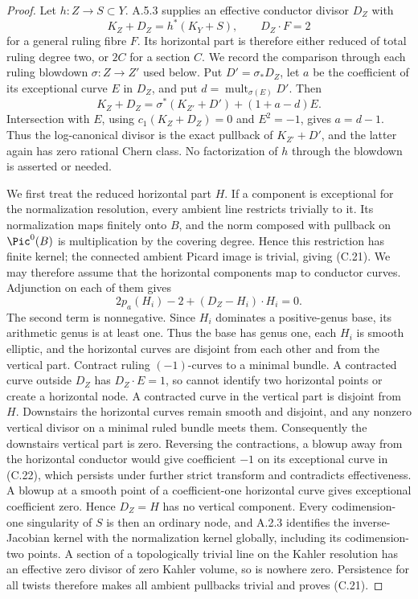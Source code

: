 \begin{proof}
Let $h:Z\to S\subset Y$. A.5.3 supplies an effective conductor divisor $D_Z$ with
\[
 K_Z+D_Z=h^*(K_Y+S),\qquad D_Z\cdot F=2              \tag{C.22}
\]
for a general ruling fibre $F$. Its horizontal part is therefore either reduced of total ruling degree two, or $2C$ for a section $C$. We record the comparison through each ruling blowdown $\sigma:Z\to Z'$ used below. Put $D'=\sigma_*D_Z$, let $a$ be the coefficient of its exceptional curve $E$ in $D_Z$, and put $d=\operatorname{mult}_{\sigma(E)}D'$. Then
\[
 K_Z+D_Z=\sigma^*(K_{Z'}+D')+(1+a-d)E.
 \tag{C.22b}
\]
Intersection with $E$, using $c_1(K_Z+D_Z)=0$ and $E^2=-1$, gives $a=d-1$. Thus the log-canonical divisor is the exact pullback of $K_{Z'}+D'$, and the latter again has zero rational Chern class. No factorization of $h$ through the blowdown is asserted or needed.

We first treat the reduced horizontal part $H$. If a component is exceptional for the normalization resolution, every ambient line restricts trivially to it. Its normalization maps finitely onto $B$, and the norm composed with pullback on $\Pic^0(B)$ is multiplication by the covering degree. Hence this restriction has finite kernel; the connected ambient Picard image is trivial, giving (C.21). We may therefore assume that the horizontal components map to conductor curves. Adjunction on each of them gives
\[
 2p_a(H_i)-2+(D_Z-H_i)\cdot H_i=0.
\]
The second term is nonnegative. Since $H_i$ dominates a positive-genus base, its arithmetic genus is at least one. Thus the base has genus one, each $H_i$ is smooth elliptic, and the horizontal curves are disjoint from each other and from the vertical part. Contract ruling $(-1)$-curves to a minimal bundle. A contracted curve outside $D_Z$ has $D_Z\cdot E=1$, so cannot identify two horizontal points or create a horizontal node. A contracted curve in the vertical part is disjoint from $H$. Downstairs the horizontal curves remain smooth and disjoint, and any nonzero vertical divisor on a minimal ruled bundle meets them. Consequently the downstairs vertical part is zero. Reversing the contractions, a blowup away from the horizontal conductor would give coefficient $-1$ on its exceptional curve in (C.22), which persists under further strict transform and contradicts effectiveness. A blowup at a smooth point of a coefficient-one horizontal curve gives exceptional coefficient zero. Hence $D_Z=H$ has no vertical component. Every codimension-one singularity of $S$ is then an ordinary node, and A.2.3 identifies the inverse-Jacobian kernel with the normalization kernel globally, including its codimension-two points. A section of a topologically trivial line on the Kahler resolution has an effective zero divisor of zero Kahler volume, so is nowhere zero. Persistence for all twists therefore makes all ambient pullbacks trivial and proves (C.21).


\end{proof}
